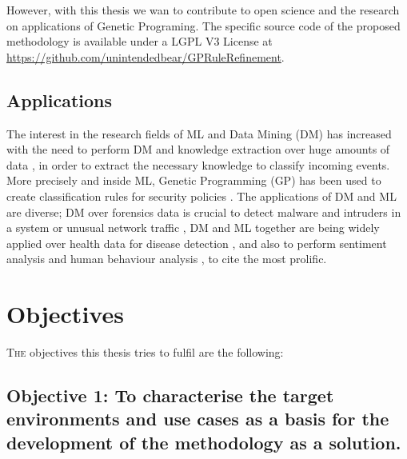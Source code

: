 However, with this thesis we wan to contribute to open science and the research on applications of Genetic Programing. 
 The specific source code of the proposed methodology is available under a LGPL V3 License at \url{https://github.com/unintendedbear/GPRuleRefinement}. 

\subsection{Applications}
\label{subsec:apps}

The interest in the research fields of ML and Data Mining (DM) has increased with the need to perform DM and knowledge extraction over huge amounts of data \cite{witten2016data}, in order to extract the necessary knowledge to classify incoming events. More precisely and inside ML, Genetic Programming (GP) has been used to create classification rules for security policies \cite{freitas2002data, DeFalco2002257, sec_policy_evolution_gp_08, pol_evol_gp_3_approaches_08}. The applications of DM and ML are diverse; DM over forensics data is crucial to detect malware \cite{Ma:2011:LDM:1961189.1961202, DeVel2001} and intruders in a system \cite{Jaswal2015} or unusual network traffic \cite{Shalaginov2017359}, DM and ML together are being widely applied over health data for disease detection \cite{Murdoch20131351}, and also to perform sentiment analysis \cite{Poria201445, Ravi201514} and human behaviour analysis \cite{Kosinski20135802}, to cite the most prolific. %

\section{Objectives}                     
\label{sec:intro:objs}

\lettrine{T}{he} objectives this thesis tries to fulfil are the following:

\newcommand{\objectivescenarios}{To characterise the target environments and use cases as a basis for the development of the methodology as a solution.} 

\subsection*{Objective 1: \objectivescenarios}
\label{subsec:intro:obj:problems}


